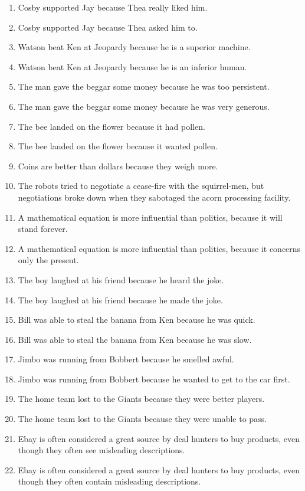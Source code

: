 \documentclass{article}
\begin{document}
\begin{enumerate}
\item Cosby supported Jay because Thea really liked him.
\item Cosby supported Jay because Thea asked him to.
\item Watson beat Ken at Jeopardy because he is a superior machine.
\item Watson beat Ken at Jeopardy because he is an inferior human.
\item The man gave the beggar some money because he was too persistent.
\item The man gave the beggar some money because he was very generous.
\item The bee landed on the flower because it had pollen.
\item The bee landed on the flower because it wanted pollen.
\item Coins are better than dollars because they weigh more.
\item The robots tried to negotiate a cease-fire with the squirrel-men, but negotiations broke down when they sabotaged the acorn processing facility.
\item A mathematical equation is more influential than politics, because it will stand forever.
\item A mathematical equation is more influential than politics, because it concerns only the present.
\item The boy laughed at his friend because he heard the joke.
\item The boy laughed at his friend because he made the joke.
\item Bill was able to steal the banana from Ken because he was quick.
\item Bill was able to steal the banana from Ken because he was slow.
\item Jimbo was running from Bobbert because he smelled awful.
\item Jimbo was running from Bobbert because he wanted to get to the car first.
\item The home team lost to the Giants because they were better players.
\item The home team lost to the Giants because they were unable to pass.
\item Ebay is often considered a great source by deal hunters to buy products, even though they often see misleading descriptions.
\item Ebay is often considered a great source by deal hunters to buy products, even though they often contain misleading descriptions.

\end{enumerate}
\end{document}
